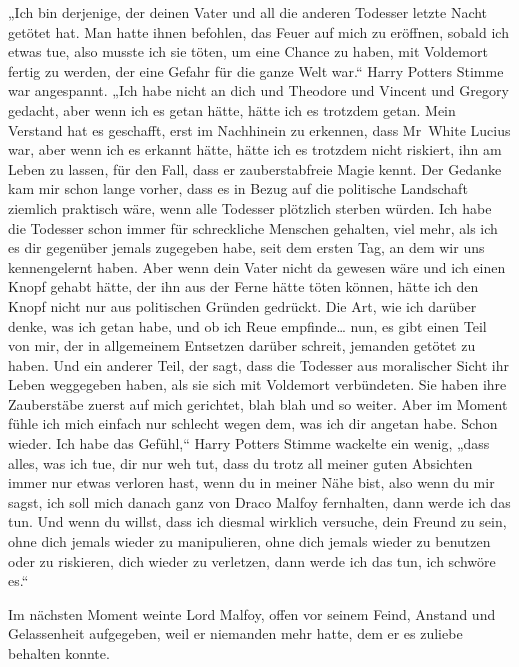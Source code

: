„Ich bin derjenige, der deinen Vater und all die anderen Todesser letzte Nacht getötet hat. Man hatte ihnen befohlen, das Feuer auf mich zu eröffnen, sobald ich etwas tue, also musste ich sie töten, um eine Chance zu haben, mit Voldemort fertig zu werden, der eine Gefahr für die ganze Welt war.“ Harry Potters Stimme war angespannt. „Ich habe nicht an dich und Theodore und Vincent und Gregory gedacht, aber wenn ich es getan hätte, hätte ich es trotzdem getan. Mein Verstand hat es geschafft, erst im Nachhinein zu erkennen, dass Mr~White Lucius war, aber wenn ich es erkannt hätte, hätte ich es trotzdem nicht riskiert, ihn am Leben zu lassen, für den Fall, dass er zauberstabfreie Magie kennt. Der Gedanke kam mir schon lange vorher, dass es in Bezug auf die politische Landschaft ziemlich praktisch wäre, wenn alle Todesser plötzlich sterben würden. Ich habe die Todesser schon immer für schreckliche Menschen gehalten, viel mehr, als ich es dir gegenüber jemals zugegeben habe, seit dem ersten Tag, an dem wir uns kennengelernt haben. Aber wenn dein Vater nicht da gewesen wäre und ich einen Knopf gehabt hätte, der ihn aus der Ferne hätte töten können, hätte ich den Knopf nicht nur aus politischen Gründen gedrückt. Die Art, wie ich darüber denke, was ich getan habe, und ob ich Reue empfinde… nun, es gibt einen Teil von mir, der in allgemeinem Entsetzen darüber schreit, jemanden getötet zu haben. Und ein anderer Teil, der sagt, dass die Todesser aus moralischer Sicht ihr Leben weggegeben haben, als sie sich mit Voldemort verbündeten. Sie haben ihre Zauberstäbe zuerst auf mich gerichtet, blah blah und so weiter. Aber im Moment fühle ich mich einfach nur schlecht wegen dem, was ich dir angetan habe. Schon wieder. Ich habe das Gefühl,“ Harry Potters Stimme wackelte ein wenig, „dass alles, was ich tue, dir nur weh tut, dass du trotz all meiner guten Absichten immer nur etwas verloren hast, wenn du in meiner Nähe bist, also wenn du mir sagst, ich soll mich danach ganz von Draco Malfoy fernhalten, dann werde ich das tun. Und wenn du willst, dass ich diesmal wirklich versuche, dein Freund zu sein, ohne dich jemals wieder zu manipulieren, ohne dich jemals wieder zu benutzen oder zu riskieren, dich wieder zu verletzen, dann werde ich das tun, ich schwöre es.“

Im nächsten Moment weinte Lord Malfoy, offen vor seinem Feind, Anstand und Gelassenheit aufgegeben, weil er niemanden mehr hatte, dem er es zuliebe behalten konnte.

